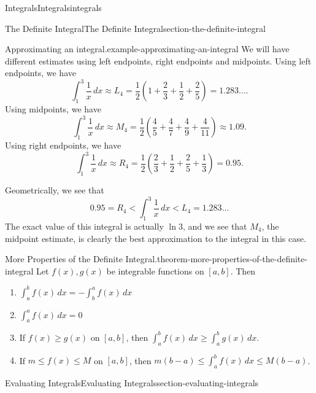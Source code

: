 \documentclass[oneside,10pt,]{book}
\numberwithin{equation}{section}
\begin{document}
\begin{chapterptx}{Integrals}{}{Integrals}{}{}{integrals}
\begin{sectionptx}{The Definite Integral}{}{The Definite Integral}{}{}{section-the-definite-integral}
\begin{example}{Approximating an integral.}{example-approximating-an-integral}
We will have different estimates using left endpoints, right endpoints and midpoints. Using left endpoints, we have%
\begin{equation*}
\int_{1}^{3}\frac{1}{x}\,dx \approx L_{4} = \frac{1}{2}\left(1 + \frac{2}{3} + \frac{1}{2} + \frac{2}{5}\right) = 1.283....
\end{equation*}
Using midpoints, we have%
\begin{equation*}
\int_{1}^{3}\frac{1}{x}\,dx \approx M_{4} = \frac{1}{2}\left(\frac{4}{5} + \frac{4}{7} + \frac{4}{9} + \frac{4}{11}\right) \approx1.09.
\end{equation*}
Using right endpoints, we have%
\begin{equation*}
\int_{1}^{3}\frac{1}{x}\,dx \approx R_{4} = \frac{1}{2}\left(\frac{2}{3} + \frac{1}{2} + \frac{2}{5} + \frac{1}{3}\right) = 0.95.
\end{equation*}
%
\par
\hypertarget{p-441}{}%
Geometrically, we see that%
\begin{equation*}
0.95 = R_{4} < \int_{1}^{3}\frac{1}{x}\,dx < L_{4} = 1.283...
\end{equation*}
The exact value of this integral is actually \(\ln 3\), and we see that \(M_{4}\), the midpoint estimate, is clearly the best approximation to the integral in this case.%
\end{example}
\begin{theorem}{More Properties of the Definite Integral.}{}{theorem-more-properties-of-the-definite-integral}%
\hypertarget{p-442}{}%
Let \(f(x),g(x)\) be integrable functions on \([a,b]\). Then\leavevmode%
\begin{enumerate}
\item\hypertarget{li-36}{}\(\int_{a}^{b}f(x)\,dx = - \int_{b}^{a}f(x)\,dx\)%
\item\hypertarget{li-37}{}\(\int_{a}^{a}f(x)\,dx = 0\)%
\item\hypertarget{li-38}{}If \(f(x)\geq g(x)\) on \([a,b]\), then \(\int_{a}^{b}f(x)\,dx \geq \int_{a}^{b}g(x)\,dx\).%
\item\hypertarget{li-39}{}If \(m\leq f(x)\leq M\) on \([a,b]\), then \(m(b-a)\leq \int_{a}^{b}f(x)\,dx\leq M(b-a)\).%
\end{enumerate}
%
\end{theorem}
\end{sectionptx}
%
%
\typeout{************************************************}
\typeout{************************************************}
%
\begin{sectionptx}{Evaluating Integrals}{}{Evaluating Integrals}{}{}{section-evaluating-integrals}

\end{sectionptx}
\end{chapterptx}
\end{document}
